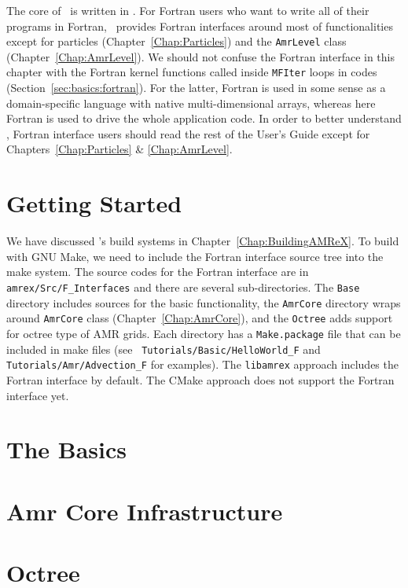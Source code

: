 The core of \amrex\ is written in \cpp.  For Fortran users who want to
write all of their programs in Fortran, \amrex\ provides Fortran
interfaces around most of functionalities except for particles
(Chapter~\ref{Chap:Particles}) and the {\tt AmrLevel} class
(Chapter~\ref{Chap:AmrLevel}).  We should not confuse the Fortran
interface in this chapter with the Fortran kernel functions called
inside {\tt MFIter} loops in \cpp codes
(Section~\ref{sec:basics:fortran}).  For the latter, Fortran is used
in some sense as a domain-specific language with native
multi-dimensional arrays, whereas here Fortran is used to drive the
whole application code.  In order to better understand \amrex, Fortran
interface users should read the rest of the User's Guide except for
Chapters~\ref{Chap:Particles} \& \ref{Chap:AmrLevel}. 

\section{Getting Started}

We have discussed \amrex's build systems in
Chapter~\ref{Chap:BuildingAMReX}.  To build with GNU Make, we need to
include the Fortran interface source tree into the make system.  The
source codes for the Fortran interface are in {\tt
amrex/Src/F\_Interfaces} and there are several sub-directories.  The
{\tt Base} directory includes sources for the basic functionality, the
{\tt AmrCore} directory wraps around {\tt AmrCore} class
(Chapter~\ref{Chap:AmrCore}), and the {\tt Octree} adds support for
octree type of AMR grids.  Each directory has a {\tt Make.package}
file that can be included in make files (see {\tt
Tutorials/Basic/HelloWorld\_F} and {\tt Tutorials/Amr/Advection\_F}
for examples).  The {\tt libamrex} approach includes the Fortran
interface by default.  The CMake approach does not support the Fortran
interface yet.



\section{The Basics}

\section{Amr Core Infrastructure}

\section{Octree}

